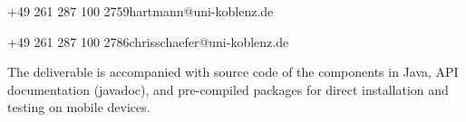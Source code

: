 \documentclass[external]{20120615_deliverable_template_ukob}
\theoremstyle{definition}
\begin{document}
\begin{LGhistory}

\end{LGhistory}


\newcommand{\LGaddauthorNoPhone}[3]{\hline  #1 &  #2 & %
   \parbox{3em}{E-mail:} \small #3 \\
}

\begin{LGauthors}

%
{+49 261 287 100 2759}{\small hartmann@uni-koblenz.de}

%
{+49 261 287 100 2786}{\small chrisschaefer@uni-koblenz.de}



\end{LGauthors}



\begin{LGExecutiveSummary}
  \vspace{10pt}

  The deliverable is accompanied with source code of the components in
  Java, API documentation (javadoc), and pre-compiled packages for
  direct installation and testing on mobile devices.

\end{LGExecutiveSummary}
\end{document}
